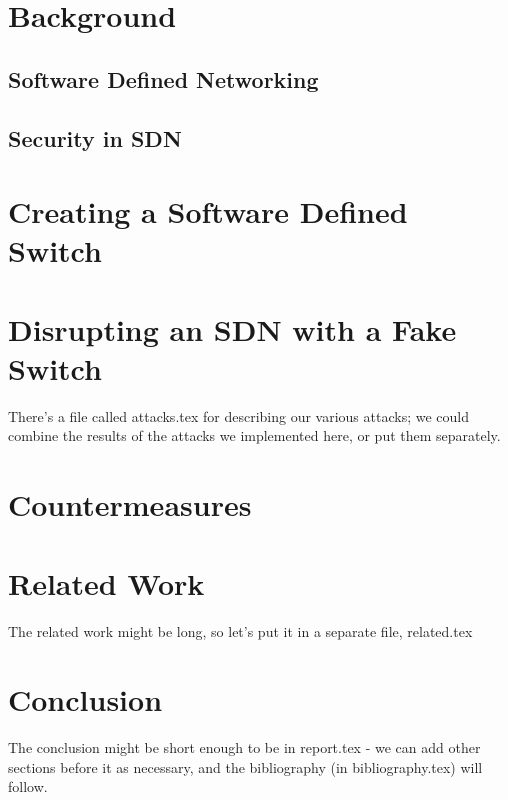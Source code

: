 \documentclass[11pt, letterpaper, twocolumn, twoside]{article}
\begin{document}
\begin{spacing}{1.0}
\section{Background}

\subsection{Software Defined Networking}

\subsection{Security in SDN}

\section{Creating a Software Defined Switch}
\label{fake}


\section{Disrupting an SDN with a Fake Switch}
\label{attacks}
There's a file called attacks.tex for describing our various attacks; we could combine the results of the attacks we implemented here, or put them separately.


\section{Countermeasures}
\label{countermeasures}


\section{Related Work}
\label{related}
The related work might be long, so let's put it in a separate file, related.tex


\section{Conclusion}
The conclusion might be short enough to be in report.tex - we can add other sections before it as necessary, and the bibliography (in bibliography.tex) will follow.





\end{spacing}
\end{document}
